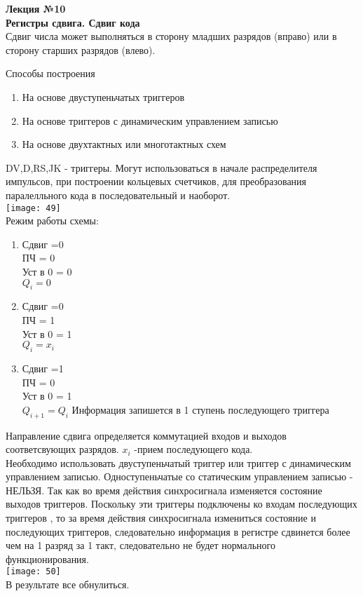 \LARGE{ \textbf {Лекция №10}}\\
\Large{ \textbf{Регистры сдвига. Сдвиг кода}}\\
Сдвиг числа может выполняться в сторону младших разрядов (вправо) или в сторону старших разрядов (влево).

Способы построения
\begin{enumerate}
  \item На основе двуступеньчатых триггеров
  \item На основе триггеров с динамическим управлением записью
  \item На основе двухтактных или многотактных схем
\end{enumerate}

DV,D,RS,JK - триггеры.
Могут использоваться в начале распределителя импульсов, при построении кольцевых счетчиков, для преобразования паралелльного кода в последовательный и наоборот.\\
\texttt{[image: 49]}\\
Режим работы схемы:\\
\begin{enumerate}
  \item Сдвиг =0\\
  ПЧ = 0\\
  Уст в 0 = 0\\
  $Q_i = 0$ \\
  \item Сдвиг =0\\
  ПЧ = 1\\
  Уст в 0 = 1\\
  $Q_i = x_i$\\
  \item Сдвиг =1\\
  ПЧ = 0\\
  Уст в 0 = 1\\
  $Q_{i+1} = Q_i$ Информация запишется в 1 ступень последующего триггера
\end{enumerate}

Направление сдвига определяется коммутацией входов и выходов соответсвующих разрядов. $x_i$ -прием последующего кода.\\
Необходимо использовать двуступеньчатый триггер или триггер с динамическим управлением записью. Одноступеньчатые со статическим управлением записью - НЕЛЬЗЯ.
Так как во время действия синхросигнала изменяется состояние выходов триггеров.
Поскольку  эти триггеры подключены ко входам последующих триггеров , то за время действия синхросигнала измениться состояние и последующих триггеров,
следовательно информация в регистре сдвинется более чем на 1 разряд за 1 такт, следовательно не будет нормального функционирования.\\
\texttt{[image: 50]}\\
В результате все обнулиться.

